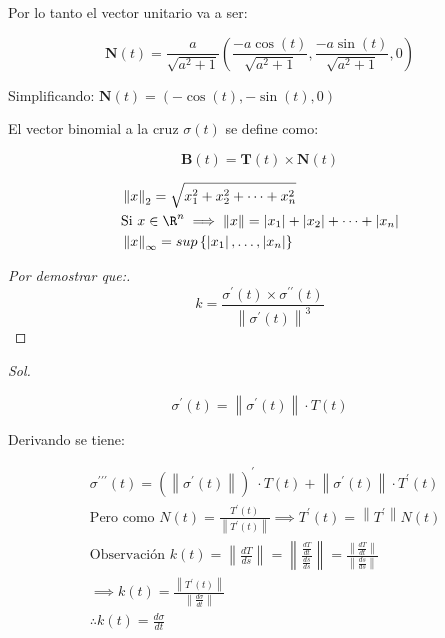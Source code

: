 Por lo tanto el vector unitario va a ser:

\begin{equation*}
	\boldsymbol{N}(t)=\frac{a}{\sqrt{a^2+1}}\left(\frac{-a\cos{(t)}}{\sqrt{a^2+1}},\frac{-a\sin{(t)}}{\sqrt{a^2+1}},0\right)
\end{equation*}

Simplificando: $\boldsymbol{N}(t)=\left(-\cos{(t)},-\sin{(t)},0\right)$

El vector binomial a la cruz $\sigma(t)$ se define como:

\begin{equation}
	\boldsymbol{B}(t)=\boldsymbol{T}(t)\times \boldsymbol{N}(t)
\end{equation}

\begin{align*}
	 & \left\lVert x\right\rVert_2=\sqrt{x_1^2+x_2^2+\dots +x_n^2}                                                                                     \\
	 & \text{Si }x\in \R^n\implies\left\lVert x\right\rVert=\left\lvert x_1\right\rvert+\left\lvert x_2\right\rvert+\dots +\left\lvert x_n\right\rvert \\
	 & \left\lVert x\right\rVert_{\infty}=sup\left\{\left\lvert x_1\right\rvert ,\dots,\left\lvert x_n\right\rvert \right\}
\end{align*}

\begin{proof}[Por demostrar que:]
	\begin{equation}
		k=\frac{\sigma^{\prime}(t)\times \sigma^{\prime\prime}(t)}{\left\lVert \sigma^{\prime}(t)\right\rVert^3}
	\end{equation}
\end{proof}

\textit{ Sol. }

\begin{equation*}
	\sigma^{\prime}(t)=\left\lVert \sigma^{\prime}(t)\right\rVert \cdot T(t)
\end{equation*}

Derivando se tiene:

\begin{align*}
	 & \sigma^{\prime\prime\prime}(t)=\left(\left\lVert \sigma^{\prime}(t)\right\rVert \right)^{\prime} \cdot T(t)+\left\lVert \sigma^{\prime}(t)\right\rVert \cdot T^{\prime}(t)                                     \\
	 & \text{Pero como }N(t)=\frac{T^{\prime}(t)}{\left\lVert T^{\prime}(t)\right\rVert}\implies T^{\prime}(t)=\left\lVert T^{\prime}\right\rVert N(t)                                                                \\
	 & \text{Observación }k(t)=\left\lVert \frac{dT}{ds}\right\rVert=\left\lVert \frac{\frac{dT}{dt}}{\frac{ds}{ds}}\right\rVert=\frac{\left\lVert \frac{dT}{dt}\right\rVert}{\left\lVert \frac{ds}{ds}\right\rVert } \\
	 & \implies k(t)=\frac{\left\lVert T^{\prime}(t)\right\rVert }{\left\lVert\frac{d\sigma}{dt}\right\rVert}                                                                                                         \\
	 & \therefore k(t)=\frac{d\sigma}{dt}
\end{align*}

